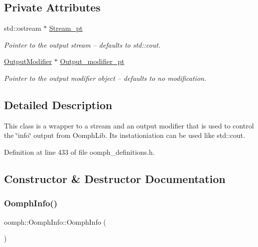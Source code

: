 \subsection*{Private Attributes}
\begin{DoxyCompactItemize}
\item 
std\+::ostream $\ast$ \hyperlink{classoomph_1_1OomphInfo_a277eeb7e2fc0712f6bec0bd1516d738d}{Stream\+\_\+pt}
\begin{DoxyCompactList}\small\item\em Pointer to the output stream -- defaults to std\+::cout. \end{DoxyCompactList}\item 
\hyperlink{classoomph_1_1OutputModifier}{Output\+Modifier} $\ast$ \hyperlink{classoomph_1_1OomphInfo_ae6763fdb47c1b4c6e40cba7d92d3b850}{Output\+\_\+modifier\+\_\+pt}
\begin{DoxyCompactList}\small\item\em Pointer to the output modifier object -- defaults to no modification. \end{DoxyCompactList}\end{DoxyCompactItemize}


\subsection{Detailed Description}
This class is a wrapper to a stream and an output modifier that is used to control the \char`\"{}info\char`\"{} output from Oomph\+Lib. Its instationiation can be used like std\+::cout. 

Definition at line 433 of file oomph\+\_\+definitions.\+h.



\subsection{Constructor \& Destructor Documentation}
\mbox{\label{classoomph_1_1OomphInfo_a9182d6aa7f2fa04a4acb899ade6949e0}} 
\subsubsection{\texorpdfstring{Oomph\+Info()}{OomphInfo()}}
{\footnotesize\ttfamily oomph\+::\+Oomph\+Info\+::\+Oomph\+Info (\begin{DoxyParamCaption}{ }\end{DoxyParamCaption})\hspace{0.3cm}{\ttfamily [inline]}}



